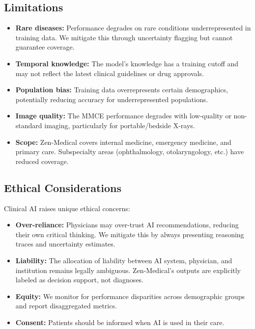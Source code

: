 \documentclass[11pt,a4paper]{article}
\begin{document}
\subsection{Limitations}

\begin{itemize}
    \item \textbf{Rare diseases:} Performance degrades on rare conditions underrepresented in training data. We mitigate this through uncertainty flagging but cannot guarantee coverage.
    \item \textbf{Temporal knowledge:} The model's knowledge has a training cutoff and may not reflect the latest clinical guidelines or drug approvals.
    \item \textbf{Population bias:} Training data overrepresents certain demographics, potentially reducing accuracy for underrepresented populations.
    \item \textbf{Image quality:} The MMCE performance degrades with low-quality or non-standard imaging, particularly for portable/bedside X-rays.
    \item \textbf{Scope:} Zen-Medical covers internal medicine, emergency medicine, and primary care. Subspecialty areas (ophthalmology, otolaryngology, etc.) have reduced coverage.
\end{itemize}

\subsection{Ethical Considerations}

Clinical AI raises unique ethical concerns:
\begin{itemize}
    \item \textbf{Over-reliance:} Physicians may over-trust AI recommendations, reducing their own critical thinking. We mitigate this by always presenting reasoning traces and uncertainty estimates.
    \item \textbf{Liability:} The allocation of liability between AI system, physician, and institution remains legally ambiguous. Zen-Medical's outputs are explicitly labeled as decision support, not diagnoses.
    \item \textbf{Equity:} We monitor for performance disparities across demographic groups and report disaggregated metrics.
    \item \textbf{Consent:} Patients should be informed when AI is used in their care.
\end{itemize}
\end{document}
